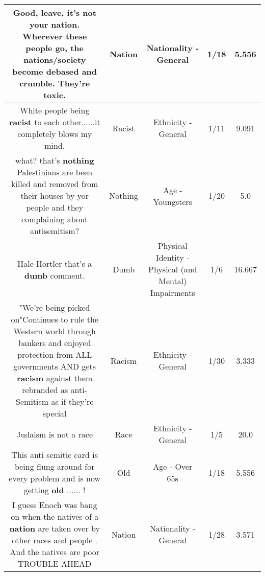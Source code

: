 \documentclass[11pt]{article}
\newlength\mylength
\begin{document}
\begin{center}
\begin{longtable}{|C{.65\mylength}|C{.30\mylength}|C{.12\mylength}|C{.12\mylength}|C{.12\mylength}|}
  \small Good, leave, it's not your \textbf{nation}.  Wherever these people go, the nations/society become debased and crumble.  They're toxic.\normalsize   & Nation & Nationality - General & 1/18 & 5.556 \\  \hline
  \small White people being \textbf{racist} to each other......it completely blows my mind.\normalsize   & Racist & Ethnicity - General & 1/11 & 9.091 \\  \hline
  \small what?  that's \textbf{nothing} Palestinians are been killed  and removed from their houses by yor people and they complaining  about antisemitism?\normalsize   & Nothing & Age - Youngsters & 1/20 & 5.0 \\  \hline
  \small Hale Hortler that's a \textbf{dumb} comment.\normalsize   & Dumb & Physical Identity - Physical (and Mental) Impairments & 1/6 & 16.667 \\  \hline
  \small "We're being picked on"Continues to rule the Western world through bankers and enjoyed protection from ALL governments AND gets \textbf{racism} against them rebranded as anti-Semitism as if they're special\normalsize   & Racism & Ethnicity - General & 1/30 & 3.333 \\  \hline
  \small Judaism is not a race\normalsize   & Race & Ethnicity - General & 1/5 & 20.0 \\  \hline
  \small This anti semitic card is being flung around for every problem  and is now getting \textbf{old} ...... !\normalsize   & Old & Age - Over 65s & 1/18 & 5.556 \\  \hline
  \small I guess Enoch was bang on when the natives of a \textbf{nation} are taken over by other races and people . And the   natives are poor TROUBLE AHEAD\normalsize   & Nation & Nationality - General & 1/28 & 3.571 \\  \hline

\end{longtable}
\end{center}
\end{document}
